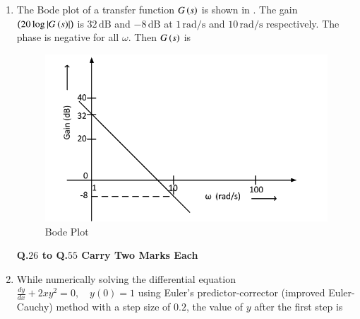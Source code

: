 \documentclass[journal,12pt,onecolumn]{IEEEtran}
\theoremstyle{remark}
\begin{document}
\begin{enumerate}
\item The Bode plot of a transfer function $G\left(s\right)$ is shown in . The gain $\left(20 \log \left\vert G\left(s\right)\right\vert\right)$ is $32\,\text{dB}$ and $-8\,\text{dB}$ at $1\,\text{rad/s}$ and $10\,\text{rad/s}$ respectively. The phase is negative for all $\omega$. Then $G\left(s\right)$ is  
\par \hfill{}
\begin{figure}[H]
    \centering
    \includegraphics[width=0.5\linewidth]{Figs/Q-25.png}
    \caption{Bode Plot}
    \label{25}
\end{figure}
\begin{enumerate}
\end{enumerate}

\textbf{Q.$26$ to Q.$55$ Carry Two Marks Each}

\item While numerically solving the differential equation $\frac{dy}{dx} + 2xy^2 = 0, \quad y(0) = 1$
using Euler's predictor-corrector (improved Euler-Cauchy) method with a step size of $0.2$, the value of $y$ after the first step is  
\par \hfill{}
\begin{enumerate}
\end{enumerate}


\end{enumerate}
\end{document}
